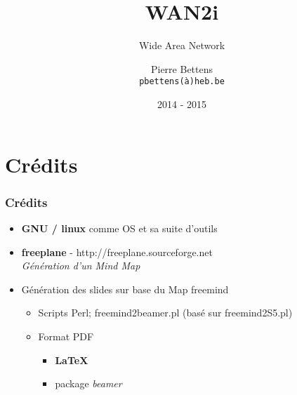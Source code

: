 \documentclass[a4paper,compress,13pt]{beamer}
\title{WAN2i}%
\subtitle{Wide Area Network}
\author[Pierre {\sc Bettens}]{Pierre {\sc Bettens} \\ \small \texttt{pbettens(\`a)heb.be}}
\institute{ÉSI - École Supérieure d'Informatique}
\date{2014 - 2015}
\begin{document}
\begin{frame}[fragile]
	\titlepage
\end{frame}











\section{Crédits}

\begin{frame}[fragile]
  \frametitle{Crédits}
\begin{itemize}
	\item \textbf{GNU / linux} comme OS et sa suite d'outils
	\item \textbf{freeplane} - http://freeplane.sourceforge.net  \\ 
	\textit{Génération d'un Mind Map}
	\item Génération des slides sur base du Map freemind 
	\begin{itemize}
		\item Scripts Perl; freemind2beamer.pl (basé sur freemind2S5.pl)
		\item Format PDF
		\begin{itemize}
			\item \textbf{ \LaTeX }
			\item package \textit{beamer} 
		\end{itemize}
	\end{itemize}
\end{itemize}
\end{frame}
\end{document}
